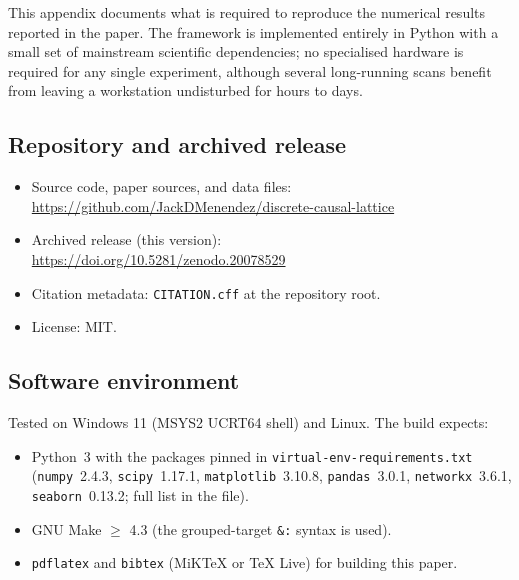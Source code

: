 
\label{sec:code_and_data}

This appendix documents what is required to reproduce the numerical
results reported in the paper.
The framework is implemented entirely in Python with a small set of
mainstream scientific dependencies; no specialised hardware is required
for any single experiment, although several long-running scans benefit
from leaving a workstation undisturbed for hours to days.

\subsection*{Repository and archived release}

\begin{itemize}
\item Source code, paper sources, and data files:\\
\url{https://github.com/JackDMenendez/discrete-causal-lattice}
\item Archived release (this version):\\
\url{https://doi.org/10.5281/zenodo.20078529}
\item Citation metadata: \texttt{CITATION.cff} at the repository root.
\item License: MIT.
\end{itemize}

\subsection*{Software environment}

Tested on Windows 11 (MSYS2 UCRT64 shell) and Linux. The build
expects:

\begin{itemize}
\item Python~3 with the packages pinned in
\nolinkurl{virtual-env-requirements.txt}
(\texttt{numpy}~2.4.3, \texttt{scipy}~1.17.1,
\texttt{matplotlib}~3.10.8, \texttt{pandas}~3.0.1,
\texttt{networkx}~3.6.1, \texttt{seaborn}~0.13.2; full list in
the file).
\item GNU Make $\geq$ 4.3 (the grouped-target \texttt{\&:} syntax is used).
\item \texttt{pdflatex} and \texttt{bibtex} (MiKTeX or TeX Live) for
building this paper.
\end{itemize}


